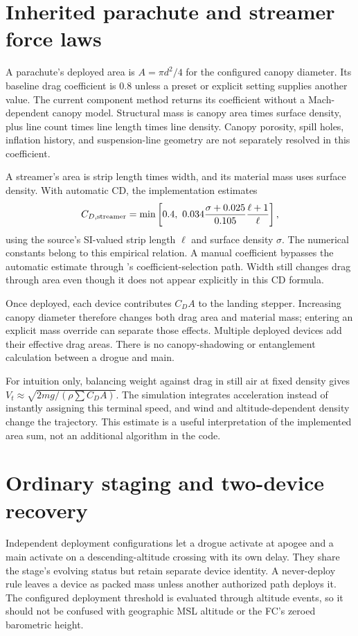 \section{Inherited parachute and streamer force laws}
A parachute's deployed area is $A=\pi d^2/4$ for the configured canopy diameter. Its baseline drag coefficient is 0.8 unless a preset or explicit setting supplies another value. The current component method returns its coefficient without a Mach-dependent canopy model. Structural mass is canopy area times surface density, plus line count times line length times line density. Canopy porosity, spill holes, inflation history, and suspension-line geometry are not separately resolved in this coefficient.

A streamer's area is strip length times width, and its material mass uses surface density. With automatic CD, the implementation estimates
\begin{equation}
C_{D,\rm streamer}=\min\left[0.4,\ 0.034\frac{\sigma+0.025}{0.105}\frac{\ell+1}{\ell}\right],
\end{equation}
using the source's SI-valued strip length $\ell$ and surface density $\sigma$. The numerical constants belong to this empirical relation. A manual coefficient bypasses the automatic estimate through 's coefficient-selection path. Width still changes drag through area even though it does not appear explicitly in this CD formula.

Once deployed, each device contributes $C_D A$ to the landing stepper. Increasing canopy diameter therefore changes both drag area and material mass; entering an explicit mass override can separate those effects. Multiple deployed devices add their effective drag areas. There is no canopy-shadowing or entanglement calculation between a drogue and main.

For intuition only, balancing weight against drag in still air at fixed density gives $V_t\approx\sqrt{2mg/(\rho\sum C_DA)}$. The simulation integrates acceleration instead of instantly assigning this terminal speed, and wind and altitude-dependent density change the trajectory. This estimate is a useful interpretation of the implemented area sum, not an additional algorithm in the code.

\section{Ordinary staging and two-device recovery}
Independent deployment configurations let a drogue activate at apogee and a main activate on a descending-altitude crossing with its own delay. They share the stage's evolving status but retain separate device identity. A never-deploy rule leaves a device as packed mass unless another authorized path deploys it. The configured deployment threshold is evaluated through altitude events, so it should not be confused with geographic MSL altitude or the FC's zeroed barometric height.

